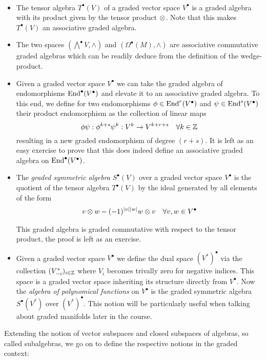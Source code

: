\begin{example}~
\begin{itemize}
  \item The tensor algebra $T^\bullet(V)$ of a graded vector space $V^\bullet$ is a graded algebra with its product given by the tensor product $\mathbin{\mathop{\otimes}\displaylimits_{}}$. Note that this makes $T^\bullet(V)$ an associative graded algebra.

  \item The two spaces $(\bigwedge^\bullet V, \wedge)$ and $(\Omega^\bullet(M), \wedge)$ are associative commutative graded algebras which can be readily deduce from the definition of the wedge-product.

  \item Given a graded vector space $V^\bullet$ we can take the graded algebra of endomorphisms $\operatorname{End}^\bullet(V^\bullet)$ and elevate it to an associative graded algebra. To this end, we define for two endomorphisms $\phi \in \End^r(V^\bullet)$ and $\psi \in \operatorname{End}^s(V^\bullet)$ their product endomorphism as the collection of linear maps
  $$ \phi \psi : \phi^{k+s}\psi^k: V^k \ra V^{k+r+s}\quad \forall k\in \ZZ $$
  resulting in a new graded endomorphism of degree $(r+s)$. It is left as an easy exercise to prove that this does indeed define an associative graded algebra on $\operatorname{End}^\bullet(V^\bullet)$.

  \item The \emph{graded symmetric algebra} $S^\bullet(V)$ over a graded vector space $V^\bullet$ is the quotient of the tensor algebra $T^\bullet(V)$ by the ideal generated by all elements of the form
  $$ v\mathbin{\mathop{\otimes}\displaylimits_{}}w - (-1)^{|v||w|} w \mathbin{\mathop{\otimes}\displaylimits_{}}v \quad \forall v,w \in V^\bullet $$
  This graded algebra is graded commutative with respect to the tensor product, the proof is left as an exercise.

  \item Given a graded vector space $V^\bullet$ we define the dual space $(V^*)^\bullet$ via the collection $(V_{-i}^*)_{i\in\mathbb{Z}}$ where $V_i$ becomes trivally zero for negative indices. This space is a graded vector space inheriting its structure directly from $V^\bullet$. Now the \emph{algebra of polynomical functions} on $V^\bullet$ is the graded symmetric algebra $S^\bullet(V^*)$ over $(V^*)^\bullet$. This notion will be particularly useful when talking about graded manifolds later in the course.
\end{itemize}
\end{example}

Extending the notion of vector subspaces and closed subspaces of algebras, so called subalgebras, we go on to define the respective notions in the graded context:


